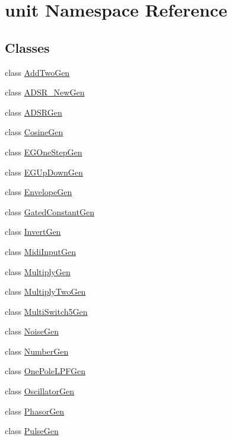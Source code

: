 \hypertarget{namespaceunit}{}\section{unit Namespace Reference}
\label{namespaceunit}
\subsection*{Classes}
\begin{DoxyCompactItemize}
\item 
class \hyperlink{classunit_1_1AddTwoGen}{Add\+Two\+Gen}
\item 
class \hyperlink{classunit_1_1ADSR__NewGen}{A\+D\+S\+R\+\_\+\+New\+Gen}
\item 
class \hyperlink{classunit_1_1ADSRGen}{A\+D\+S\+R\+Gen}
\item 
class \hyperlink{classunit_1_1CosineGen}{Cosine\+Gen}
\item 
class \hyperlink{classunit_1_1EGOneStepGen}{E\+G\+One\+Step\+Gen}
\item 
class \hyperlink{classunit_1_1EGUpDownGen}{E\+G\+Up\+Down\+Gen}
\item 
class \hyperlink{classunit_1_1EnvelopeGen}{Envelope\+Gen}
\item 
class \hyperlink{classunit_1_1GatedConstantGen}{Gated\+Constant\+Gen}
\item 
class \hyperlink{classunit_1_1InvertGen}{Invert\+Gen}
\item 
class \hyperlink{classunit_1_1MidiInputGen}{Midi\+Input\+Gen}
\item 
class \hyperlink{classunit_1_1MultiplyGen}{Multiply\+Gen}
\item 
class \hyperlink{classunit_1_1MultiplyTwoGen}{Multiply\+Two\+Gen}
\item 
class \hyperlink{classunit_1_1MultiSwitch5Gen}{Multi\+Switch5\+Gen}
\item 
class \hyperlink{classunit_1_1NoiseGen}{Noise\+Gen}
\item 
class \hyperlink{classunit_1_1NumberGen}{Number\+Gen}
\item 
class \hyperlink{classunit_1_1OnePoleLPFGen}{One\+Pole\+L\+P\+F\+Gen}
\item 
class \hyperlink{classunit_1_1OscillatorGen}{Oscillator\+Gen}
\item 
class \hyperlink{classunit_1_1PhasorGen}{Phasor\+Gen}
\item 
class \hyperlink{classunit_1_1PulseGen}{Pulse\+Gen}
\item 

\end{DoxyCompactItemize}
